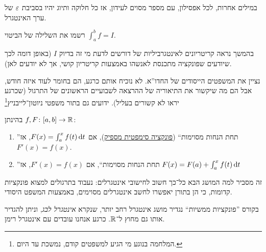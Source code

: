 \documentclass[name=רשימות חדו''א 2א]{../../../tex/classes/noChapterMegasumPreamble}
\begin{document}
	במילים אחרות, לכל אפסילון, עם מספר מסוים לעידון, אז כל חלוקה ותיוג יהיו בסביבת $\eg$ של ערך האינטגרל.



	\begin{Exercise}
		רשמו את השלילה של הביטוי $\int^{b}_a f = I$.
	\end{Exercise}

	בהמשך נראה קריטריונים לאינטגרביליות של דורשים לדעת מי זה בדיוק $I$ (באופן דומה לכך שיודעים שפונקציה מתכנסת לאנשהו באמצעות קריטריון קושי, אך לא יודעים לאן).

	נציין את המשפטים הייסודים של החדו''א. לא נוכיח אותם כרגע, הם בחומר לעוד איזה חודש, אבל הם מה שיקשור את התיאוריה של ההרצאה לשבועיים הראשונים של התרגול (שכרגע יראו לא קשורים בעליל). ידועים גם בתור משפטי ניוטון־לייבניץ\footnote{המלחמה בנוגע מי הגיע למשפטים קודם, נמשכת עד היום. }

	בהינתן $f, F \colon [a, b] \to \mathbb{R}$:
	\begin{enumerate}
		\item ''תחת הנחות מסוימות`` (\href{https://eincyclopedia.org/wiki/\%D7\%A4\%D7\%95\%D7\%A0\%D7\%A7\%D7\%A6\%D7\%99\%D7\%94\_\%D7\%A1\%D7\%99\%D7\%9E\%D7\%A4\%D7\%98\%D7\%99\%D7\%AA}{פונקציה סימפטית מספיק}), אם $F(x) = \int^{x}_a f(t) \,\mathrm{d}t$, אז $F'(x) = f(x)$.
		\item ''תחת הנחות מסוימות``, אם $F'(x) = f(x)$, אז $F(x) = F(a) + \int^{x}_af(t)\,\mathrm{d}t$
	\end{enumerate}
	זה מסביר למה המושג הבא כל־כך חשוב לחישובי אינטגרלים:
	נעבוד בתרגולים למצוא פונקציות קדומות, כי הן בתורן יאפשרו לחשב אינטגרלים מסוימים, באמצעות המשפט היסודי.

	בקורס ''פונקציות ממשיות`` נגדיר מושג אינטגרל רחב יותר, שנקרא \textit{אינטגרל לבג}, וניתן להגדיר אותו גם מחוץ ל־$\mathbb{R}$. כרגע אנחנו עובדים עם אינטגרל רימן.
\end{document}
